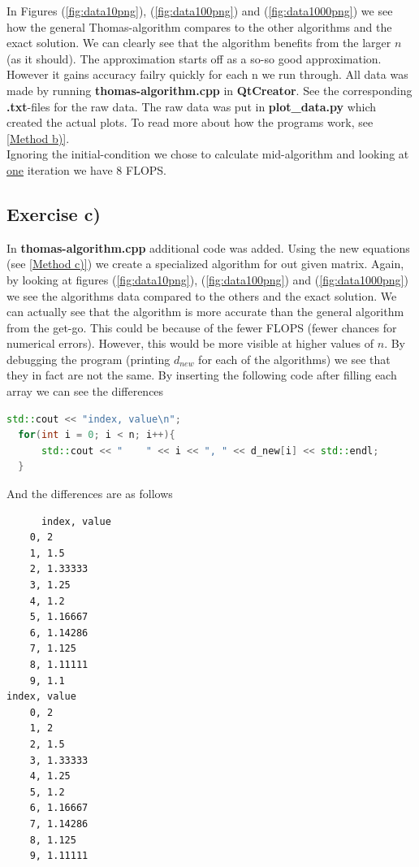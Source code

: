 \documentclass{article}
\begin{document}
  In Figures (\ref{fig:data10png}), (\ref{fig:data100png}) and (\ref{fig:data1000png}) we see how the general Thomas-algorithm compares to the other algorithms and the exact solution. We can clearly see that the algorithm benefits from the larger $n$ (as it should). The approximation starts off as a so-so good approximation. However it gains accuracy failry quickly for each n we run through. All data was made by running \textbf{thomas-algorithm.cpp} in \textbf{QtCreator}. See the corresponding \textbf{.txt}-files for the raw data. The raw data was put in \textbf{plot\_data.py} which created the actual plots. To read more about how the programs work, see \ref{Method b)}.\\
  Ignoring the initial-condition we chose to calculate mid-algorithm and looking at \underline{one} iteration we have 8 FLOPS.

  \subsection{Exercise c)} \label{Results c)}

  In \textbf{thomas-algorithm.cpp} additional code was added. Using the new equations (see \ref{Method c)}) we create a specialized algorithm for out given matrix. Again, by looking at figures (\ref{fig:data10png}), (\ref{fig:data100png}) and (\ref{fig:data1000png}) we see the algorithms data compared to the others and the exact solution. We can actually see that the algorithm is more accurate than the general algorithm from the get-go. This could be because of the fewer FLOPS (fewer chances for numerical errors). However, this would be more visible at higher values of $n$. By debugging the program (printing $d_{new}$ for each of the algorithms) we see that they in fact are not the same. By inserting the following code after filling each array we can see the differences
  \begin{lstlisting}[language=C++]
    std::cout << "index, value\n";
  for(int i = 0; i < n; i++){
      std::cout << "    " << i << ", " << d_new[i] << std::endl;
  }
  \end{lstlisting}

  And the differences are as follows

  \begin{verbatim}
      index, value
    0, 2
    1, 1.5
    2, 1.33333
    3, 1.25
    4, 1.2
    5, 1.16667
    6, 1.14286
    7, 1.125
    8, 1.11111
    9, 1.1
index, value
    0, 2
    1, 2
    2, 1.5
    3, 1.33333
    4, 1.25
    5, 1.2
    6, 1.16667
    7, 1.14286
    8, 1.125
    9, 1.11111
  \end{verbatim}
\end{document}
